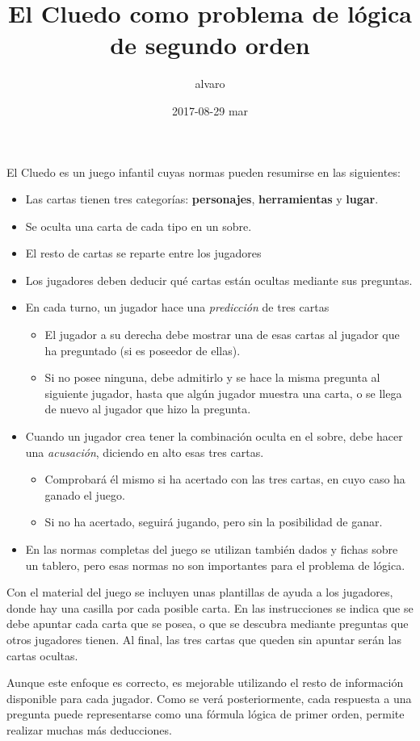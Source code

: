 \documentclass[11pt]{article}
\author{alvaro}
\date{2017-08-29 mar}
\title{El Cluedo como problema de lógica de segundo orden}
\begin{document}
\maketitle
El Cluedo es un juego infantil cuyas normas pueden resumirse en las siguientes:
\begin{itemize}
\item Las cartas tienen tres categorías: \textbf{personajes}, \textbf{herramientas} y \textbf{lugar}.
\item Se oculta una carta de cada tipo en un sobre.
\item El resto de cartas se reparte entre los jugadores
\item Los jugadores deben deducir qué cartas están ocultas mediante sus preguntas.
\item En cada turno, un jugador hace una \emph{predicción} de tres cartas
\begin{itemize}
\item El jugador a su derecha debe mostrar una de esas cartas al jugador que ha preguntado (si es poseedor de ellas).
\item Si no posee ninguna, debe admitirlo y se hace la misma pregunta al siguiente jugador, hasta que algún jugador muestra una carta, o se llega de nuevo al jugador que hizo la pregunta.
\end{itemize}
\item Cuando un jugador crea tener la combinación oculta en el sobre, debe hacer una \emph{acusación}, diciendo en alto esas tres cartas.
\begin{itemize}
\item Comprobará él mismo si ha acertado con las tres cartas, en cuyo caso ha ganado el juego.
\item Si no ha acertado, seguirá jugando, pero sin la posibilidad de ganar.
\end{itemize}
\item En las normas completas del juego se utilizan también dados y fichas sobre un tablero, pero esas normas no son importantes para el problema de lógica.
\end{itemize}


Con el material del juego se incluyen unas plantillas de ayuda a los jugadores, donde hay una casilla por cada posible carta. En las instrucciones se indica que se debe apuntar cada carta que se posea, o que se descubra mediante preguntas que otros jugadores tienen. Al final, las tres cartas que queden sin apuntar serán las cartas ocultas. 

Aunque este enfoque es correcto, es mejorable utilizando el resto de información disponible para cada jugador. Como se verá posteriormente, cada respuesta a una pregunta puede representarse como una fórmula lógica de primer orden, permite realizar muchas más deducciones.
\end{document}
